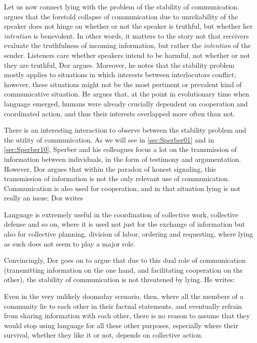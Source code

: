 Let us now connect lying with the problem of the stability of communication.
\citet{Dor17} argues that the foretold collapse of communication due to unreliability of the speaker does not hinge on whether or not the speaker is truthful, but whether her \emph{intention} is benevolent.
In other words, it matters to the story not that receivers evaluate the truthfulness of incoming information, but rather the \emph{intention} of the sender. Listeners care whether speakers intend to be harmful, not whether or not they are truthful, Dor argues.
Moreover, he notes that the stability problem mostly applies to situations in which interests between interlocutors conflict; however, these situations might not be the most pertinent or prevalent kind of communicative situation.
He argues that, at the point in evolutionary time when language emerged, humans were already crucially dependent on cooperation and coordinated action, and thus their interests overlapped more often than not.

There is an interesting interaction to observe between the stability problem and the utility of communication. As we will see in \cref{sec:Sperber01} and in \cref{sec:Sperber10}, Sperber and his colleagues focus a lot on the transmission of information between individuals, in the form of testimony and argumentation. However, Dor argues that within the paradox of honest signaling, this transmission of information is not the only relevant use of communication. Communication is also used for cooperation, and in that situation lying is not really an issue; Dor writes
\begin{quoting}
    Language is extremely useful in the coordination of collective work, collective defense and so on, where it is used not just for the exchange of information but also for collective planning, division of labor, ordering and requesting, where lying as such does not seem to play a major role.
    \hfill \citep[p.~51]{Dor17}
\end{quoting}
Convincingly, Dor goes on to argue that due to this dual role of communication (transmitting information on the one hand, and facilitating cooperation on the other), the stability of communication is not threatened by lying. He writes:
\begin{quoting}
    Even in the very unlikely doomsday scenario, then, where all the members of a community lie to each other in their factual statements, and eventually refrain from sharing information with each other, there is no reason to assume that they would stop using language for all these other purposes, especially where their survival, whether they like it or not, depends on collective action.
    \hfill \citep[p.~52]{Dor17}
\end{quoting}

